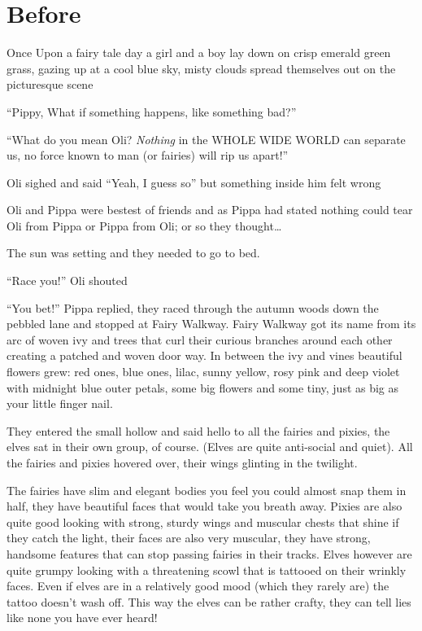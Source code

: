 
\chapter{Before}

\sffamily \large
Once Upon a fairy tale day a girl and a boy lay down on crisp emerald
green grass, gazing up at a cool blue sky, misty clouds spread
themselves out on the picturesque scene

``Pippy, What if something happens, like something bad?''

``What do you mean Oli? \emph{Nothing} in the WHOLE WIDE WORLD can
separate us, no force known to man (or fairies) will rip us apart!''

Oli sighed and said ``Yeah, I guess so'' but something inside him felt
wrong

Oli and Pippa were bestest of friends and as Pippa had stated nothing
could tear Oli from Pippa or Pippa from Oli; or so they thought\ldots{}

The sun was setting and they needed to go to bed.

``Race you!'' Oli shouted

``You bet!'' Pippa replied, they raced through the autumn woods down the
pebbled lane and stopped at Fairy Walkway. Fairy Walkway got its name
from its arc of woven ivy and trees that curl their curious branches
around each other creating a patched and woven door way. In between the
ivy and vines beautiful flowers grew: red ones, blue ones, lilac, sunny
yellow, rosy pink and deep violet with midnight blue outer petals, some
big flowers and some tiny, just as big as your little finger nail.

They entered the small hollow and said hello to all the fairies and
pixies, the elves sat in their own group, of course. (Elves are quite
anti-social and quiet). All the fairies and pixies hovered over, their
wings glinting in the twilight.

The fairies have slim and elegant bodies you feel you could almost snap
them in half, they have beautiful faces that would take you breath away.
Pixies are also quite good looking with strong, sturdy wings and
muscular chests that shine if they catch the light, their faces are also
very muscular, they have strong, handsome features that can stop passing
fairies in their tracks. Elves however are quite grumpy looking with a
threatening scowl that is tattooed on their wrinkly faces. Even if elves
are in a relatively good mood (which they rarely are) the tattoo doesn't
wash off. This way the elves can be rather crafty, they can tell lies
like none you have ever heard!

